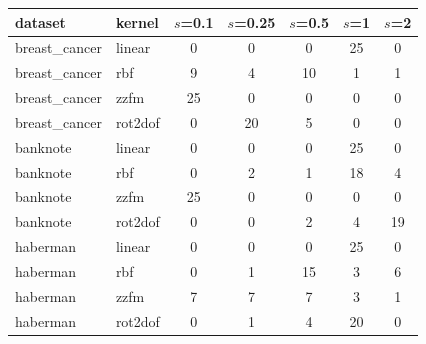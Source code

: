 \begin{tabular}{llccccc}
\hline
dataset & kernel & $s$=0.1 & $s$=0.25 & $s$=0.5 & $s$=1 & $s$=2 \\
\hline
breast\_cancer & linear & 0 & 0 & 0 & 25 & 0 \\
breast\_cancer & rbf & 9 & 4 & 10 & 1 & 1 \\
breast\_cancer & zzfm & 25 & 0 & 0 & 0 & 0 \\
breast\_cancer & rot2dof & 0 & 20 & 5 & 0 & 0 \\
banknote & linear & 0 & 0 & 0 & 25 & 0 \\
banknote & rbf & 0 & 2 & 1 & 18 & 4 \\
banknote & zzfm & 25 & 0 & 0 & 0 & 0 \\
banknote & rot2dof & 0 & 0 & 2 & 4 & 19 \\
haberman & linear & 0 & 0 & 0 & 25 & 0 \\
haberman & rbf & 0 & 1 & 15 & 3 & 6 \\
haberman & zzfm & 7 & 7 & 7 & 3 & 1 \\
haberman & rot2dof & 0 & 1 & 4 & 20 & 0 \\
\hline
\end{tabular}

